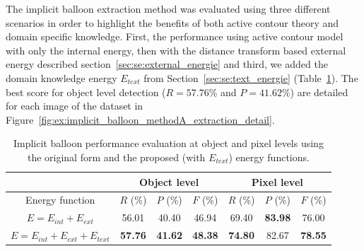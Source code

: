 The implicit balloon extraction method was evaluated using three different scenarios in order to highlight the benefits of both active contour theory and domain specific knowledge.
First, the performance using active contour model with only the internal energy, then with the distance transform based external energy described section~\ref{sec:se:external_energie} and third, we added the domain knowledge energy $E_{text}$ from Section~\ref{sec:se:text_energie} (Table~\ref{tab:ex:implicit_balloon_performance_object_pixel_comparison}).
The best score for object level detection ($R=57.76\%$ and $P=41.62\%$) are detailed for each image of the dataset in Figure~\ref{fig:ex:implicit_balloon_methodA_extraction_detail}.



\begin{table}[h]
  \normalsize
  \centering
  \caption{Implicit balloon performance evaluation at object and pixel levels using the original form and the proposed (with $E_{text}$) energy functions.}
  \begin{tabular}{|c|c|c|c|c|c|c|}
  \hline
    & \multicolumn{3}{|c|}{Object level}  & \multicolumn{3}{|c|}{Pixel level}   \\
  \hline
  Energy function  &  $ R$ (\%)  & $P$ (\%)& $F$ (\%)   &  $R$ (\%)  & $P$ (\%)   & $F$ (\%)\\
  \hline

   $E = E_{int} + E_{ext}$    & 56.01       & 40.40     & 46.94       & 69.40  & \textbf{83.98} & 76.00   \\
  \hline
  $E = E_{int} + E_{ext} + E_{text}$   & \textbf{57.76} & \textbf{41.62} & \textbf{48.38} & \textbf{74.80} & 82.67 & \textbf{78.55}    \\
  \hline
  \end{tabular}
      \label{tab:ex:implicit_balloon_performance_object_pixel_comparison}
\end{table}%

